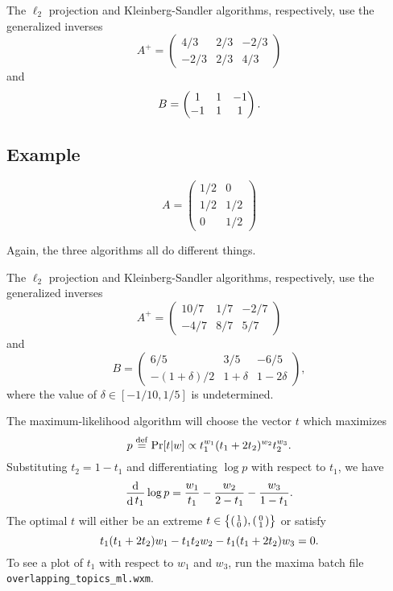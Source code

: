 \documentclass{article}
\newcommand{\DefEq}{\stackrel{\mathrm{def}}{=}}
\DeclareMathOperator{\D}{d}
\begin{document}
The \(\ell_2\) projection and Kleinberg-Sandler algorithms, respectively, use the generalized inverses
\[
    A^+ =
    \begin{pmatrix}
         4/3 & 2/3 & -2/3
    \\  -2/3 & 2/3 &  4/3
    \end{pmatrix}
\]
    and
\[
    B =
    \begin{pmatrix}
         1 & 1 & -1
    \\  -1 & 1 &  1
    \end{pmatrix}
    \ldotp
\]

\subsection{Example}

\[
    A =
    \begin{pmatrix}
        1/2 & 0
    \\  1/2 & 1/2
    \\  0   & 1/2
    \end{pmatrix}
\]

Again, the three algorithms all do different things.

The \(\ell_2\) projection and Kleinberg-Sandler algorithms, respectively, use the generalized inverses
\[
    A^+ =
    \begin{pmatrix}
        10/7 & 1/7 & -2/7
    \\  -4/7 & 8/7 &  5/7
    \end{pmatrix}
\]
    and
\[
    B =
    \begin{pmatrix}
        6/5               & 3/5        & -6/5
    \\  -(1 + \delta) / 2 & 1 + \delta & 1 - 2 \delta
    \end{pmatrix}
    ,
\]
where the value of \(\delta \in [-1/10, 1/5]\) is undetermined.

The maximum-likelihood algorithm will choose the vector \(t\) which maximizes
\[ p \DefEq \Pr[ t | w ] \propto t_1^{w_1} (t_1 + 2 t_2)^{w_2} t_2^{w_3} \ldotp \]
Substituting \(t_2 = 1 - t_1\) and differentiating \(\log p\) with respect to \(t_1\), we have
\[ \frac {\D} {\D t_1} \log p = \frac {w_1} {t_1} - \frac {w_2} {2 - t_1} - \frac {w_3} {1 - t_1} \ldotp \]
The optimal \(t\) will either be an extreme \(t \in \big\{ \begin{psmallmatrix} 1 \\ 0 \end{psmallmatrix}, \begin{psmallmatrix} 0 \\ 1 \end{psmallmatrix} \big\}\) or satisfy
\[ t_1 (t_1 + 2 t_2) w_1 - t_1 t_2 w_2 - t_1 (t_1 + 2 t_2) w_3 = 0 \ldotp \]
To see a plot of \(t_1\) with respect to \(w_1\) and \(w_3\), run the maxima batch file \texttt{overlapping\_topics\_ml.wxm}.

{}

\end{document}
